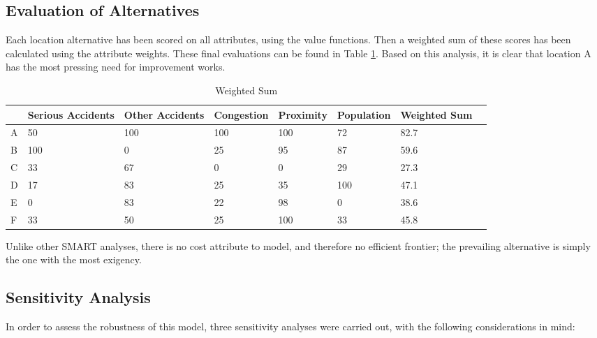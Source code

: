 \documentclass[11pt, a4paper]{article}
\begin{document}
    \subsection{Evaluation of Alternatives}

    Each location alternative has been scored on all attributes, using the value functions. Then a weighted sum of these scores has been calculated using the attribute weights. These final evaluations can be found in Table \ref{t10}. Based on this analysis, it is clear that location A has the most pressing need for improvement works.

    \begin{table}[!ht]
        \centering
        \begin{tabular}{|l|l|l|l|l|l|l|l|}
        \hline
            ~ & Serious Accidents & Other Accidents & Congestion & Proximity & Population & Weighted Sum   \\ \hline
            A & 50 & 100 & 100 & 100 & 72 & 82.7   \\ \hline
            B & 100 & 0 & 25 & 95 & 87 & 59.6   \\ \hline
            C & 33 & 67 & 0 & 0 & 29 & 27.3   \\ \hline
            D & 17 & 83 & 25 & 35 & 100 & 47.1   \\ \hline
            E & 0 & 83 & 22 & 98 & 0 & 38.6   \\ \hline
            F & 33 & 50 & 25 & 100 & 33 & 45.8   \\ \hline
        \end{tabular}
        \caption{Weighted Sum}
        \label{t10}
    \end{table}

    Unlike other SMART analyses, there is no cost attribute to model, and therefore no efficient frontier; the prevailing alternative is simply the one with the most exigency.

    \subsection{Sensitivity Analysis}

    In order to assess the robustness of this model, three sensitivity analyses were carried out, with the following considerations in mind:
\end{document}

